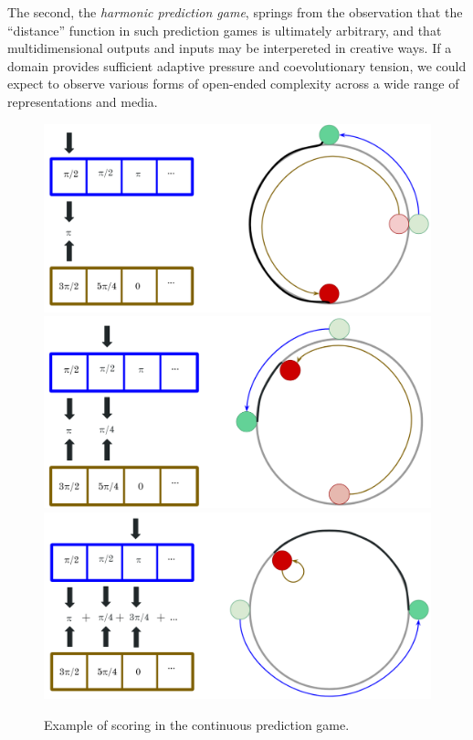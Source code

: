 \documentclass{article}
\begin{document}
The second, the \textit{harmonic prediction game}, springs from the observation that the 
``distance'' function in such prediction games is ultimately arbitrary, and that multidimensional
outputs and inputs may be interpereted in creative ways. If a domain provides sufficient 
adaptive pressure and coevolutionary tension, we could expect to observe various forms
of open-ended complexity across a wide range of representations and media.

\begin{figure}[H]
    \begin{center}
        \includegraphics[width=4.5in]{con2.png}
        \includegraphics[width=4.5in]{con3.png}
        \includegraphics[width=4.5in]{con4.png}
        \caption{Example of scoring in the continuous prediction game.}
        \label{continuous}
    \end{center}
\end{figure}
\end{document}
